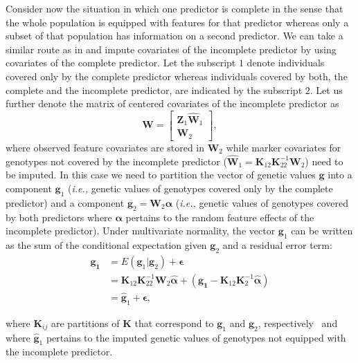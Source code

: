 \documentclass[12pt,titlepage]{article}
\begin{document}
Consider now the situation in which one predictor is complete in the sense that
the whole population is equipped with features for that predictor whereas only
a subset of that population has information on a second predictor.
We can take a similar route as in  and impute covariates 
of the incomplete predictor by using covariates of the complete predictor.
Let the subscript $1$ denote individuals covered only by the complete
predictor whereas individuals covered by both, the complete and the
incomplete predictor, are indicated by the subscript $2$.
Let us further denote the matrix of centered covariates of the incomplete
predictor as
\begin{equation} \label{eq:incomplete-covariates}
\mathbf{W} =
\begin{bmatrix}
  \mathbf{Z}_{1}\mathbf{\hat{W}}_{1} \\
  \mathbf{W}_{2}
 \end{bmatrix},
\end{equation}
where observed feature covariates are stored in $\mathbf{W}_{2}$ while marker
covariates for genotypes not covered by the incomplete predictor
($\mathbf{\hat{W}}_{1} = \mathbf{K}_{12} \mathbf{K}^{-1}_{22} \mathbf{W}_{2}$)
need to be imputed.
In this case we need to partition the vector of genetic values $\mathbf{g}$
into a component $\mathbf{g}_{1}$ (\textit{i.e.,} genetic values of genotypes
covered only by the complete predictor) and a component
$\mathbf{g}_{2} = \mathbf{W}_{2}\boldsymbol{\alpha}$ (\textit{i.e.,} genetic
values of genotypes covered by both predictors where $\boldsymbol{\alpha}$
pertains to the random feature effects of the incomplete predictor).
Under multivariate normality, the vector $\mathbf{g}_1$ can be written as the
sum of the conditional expectation given $\mathbf{g}_2$ and a residual error
term:
\begin{align} \label{eq:mrna1}
	\mathbf{g_1} &= E(\mathbf{g}_1|\mathbf{g}_2) + \boldsymbol{\epsilon} \\
	&= \mathbf{K}_{12}\mathbf{K}^{-1}_{22}\mathbf{W}_{2}
	\boldsymbol{\hat{\alpha}} + (\mathbf{g_1} - \mathbf{K}_{12}
	\mathbf{K}^{-1}_{2}
	\boldsymbol{\hat{\alpha}}) \\
	&= \mathbf{\hat{g}}_1 + \boldsymbol{\epsilon},
\end{align}

where $\mathbf{K}_{ij}$ are partitions of $\mathbf{K}$ that correspond to 
$\mathbf{g}_{1}$ and $\mathbf{g}_{2}$, respectively~\cite{Fernando2014} and
where $\mathbf{\hat{g}}_{1}$ pertains to the imputed genetic values of genotypes
not equipped with the incomplete predictor.
\end{document}
